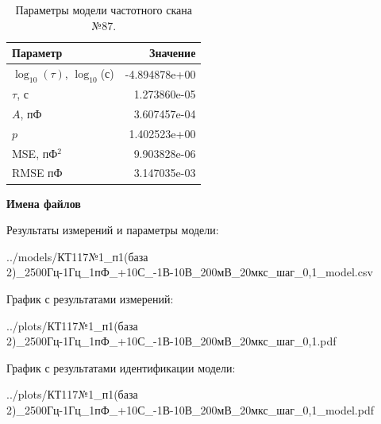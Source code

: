 \begin{table}[!ht]
    \centering
    \caption{Параметры модели частотного скана №87.}
    \begin{tabular}{|l|r|}
        \hline
        Параметр                                       & Значение                  \\ \hline
        $\log_{10}(\tau)$, $\log_{10}$(с)              & -4.894878e+00             \\ \hline
        $\tau$, с                                      & 1.273860e-05              \\ \hline
        $A$, пФ                                        & 3.607457e-04              \\ \hline
        $p$                                            & 1.402523e+00              \\ \hline
        MSE, пФ$^2$                                    & 9.903828e-06              \\ \hline
        RMSE пФ                                        & 3.147035e-03              \\ \hline
    \end{tabular}
    \label{table:frequency_scan_model_87}
\end{table}

\textbf{Имена файлов}

Результаты измерений и параметры модели:

\scriptsize../models/КТ117№1\_п1(база 2)\_2500Гц-1Гц\_1пФ\_+10С\_-1В-10В\_200мВ\_20мкс\_шаг\_0,1\_model.csv
\normalsize

График с результатами измерений:

\scriptsize../plots/КТ117№1\_п1(база 2)\_2500Гц-1Гц\_1пФ\_+10С\_-1В-10В\_200мВ\_20мкс\_шаг\_0,1.pdf
\normalsize

График с результатами идентификации модели:

\scriptsize../plots/КТ117№1\_п1(база 2)\_2500Гц-1Гц\_1пФ\_+10С\_-1В-10В\_200мВ\_20мкс\_шаг\_0,1\_model.pdf
\normalsize

